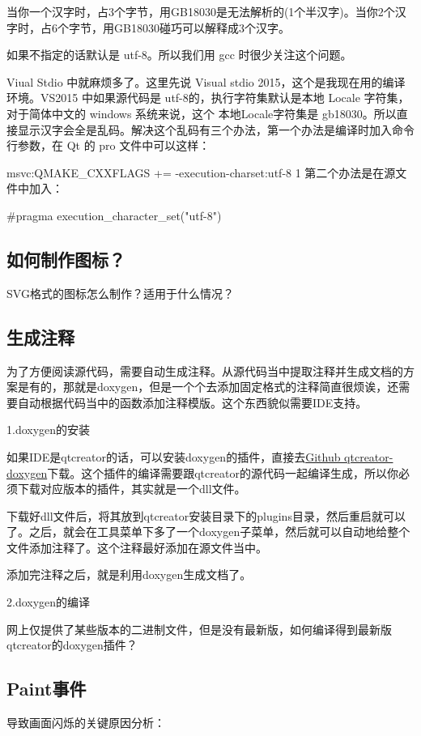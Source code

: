 当你一个汉字时，占3个字节，用GB18030是无法解析的(1个半汉字)。当你2个汉字时，占6个字节，用GB18030碰巧可以解释成3个汉字。

如果不指定的话默认是 utf-8。所以我们用 gcc 时很少关注这个问题。

Viual Stdio 中就麻烦多了。这里先说 Visual stdio 2015，这个是我现在用的编译环境。VS2015 中如果源代码是 utf-8的，执行字符集默认是本地 Locale 字符集，对于简体中文的 windows 系统来说，这个 本地Locale字符集是 gb18030。所以直接显示汉字会全是乱码。解决这个乱码有三个办法，第一个办法是编译时加入命令行参数，在 Qt 的 pro 文件中可以这样：

msvc:QMAKE\_CXXFLAGS += -execution-charset:utf-8
1
第二个办法是在源文件中加入：

\#pragma execution\_character\_set("utf-8")

\subsection{如何制作图标？}
SVG格式的图标怎么制作？适用于什么情况？

\subsection{生成注释}
为了方便阅读源代码，需要自动生成注释。从源代码当中提取注释并生成文档的方案是有的，那就是doxygen，但是一个个去添加固定格式的注释简直很烦诶，还需要自动根据代码当中的函数添加注释模版。这个东西貌似需要IDE支持。

1.doxygen的安装

如果IDE是qtcreator的话，可以安装doxygen的插件，直接去\href{https://github.com/fpoussin/qtcreator-doxygen}{Github qtcreator-doxygen}下载。这个插件的编译需要跟qtcreator的源代码一起编译生成，所以你必须下载对应版本的插件，其实就是一个dll文件。

下载好dll文件后，将其放到qtcreator安装目录下的plugins目录，然后重启就可以了。之后，就会在工具菜单下多了一个doxygen子菜单，然后就可以自动地给整个文件添加注释了。这个注释最好添加在源文件当中。

添加完注释之后，就是利用doxygen生成文档了。

2.doxygen的编译

网上仅提供了某些版本的二进制文件，但是没有最新版，如何编译得到最新版qtcreator的doxygen插件？

\subsection{Paint事件}
导致画面闪烁的关键原因分析：

